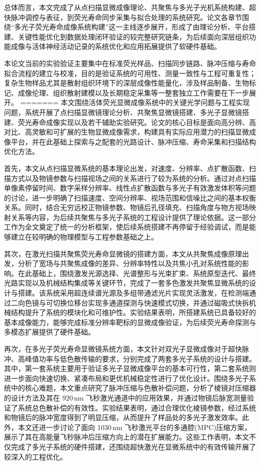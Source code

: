 总体而言，本文完成了从点扫描显微成像理论、共聚焦与多光子光机系统构建、超快脉冲调控与表征，到荧光寿命同步采集与拟合处理的系统研究。论文各章节围绕“多光子荧光寿命成像系统构建”这一主线逐步展开，形成了由理论分析、平台搭建、关键性能优化到数据处理闭环验证的较完整研究链条，为后续面向深层组织功能成像与活体神经活动记录的系统优化和应用拓展提供了软硬件基础。

本论文当前的实验验证主要集中在标准荧光样品、扫描同步链路、脉冲压缩与寿命拟合流程的建立与校准，目的是验证系统的可用性、测量一致性与工程可重复性；复杂生物样品尤其是散射组织环境下的深层成像性能量化，涉及样品制备、生物标记、成像伦理、组织散射建模以及长期稳定采集等一整套独立工作需要在下一步展开。
=======
本文围绕活体荧光显微成像系统中的关键光学问题与工程实现问题，系统开展了点扫描显微镜理论分析、共聚焦显微镜搭建、多光子显微镜搭建、荧光寿命成像实现以及若干辅助实验研究。论文的核心目标是面向高分辨、高对比、高灵敏和可扩展的生物显微成像需求，构建具有实际应用潜力的扫描显微成像平台，并在此基础上探索与之配套的光路设计、脉冲压缩、寿命采集和扫描结构优化方法。

首先，本文从点扫描显微系统的基本理论出发，对速度、分辨率、点扩散函数、扫描方式以及物镜参数与扫描视场之间的关系进行了较为系统的分析。通过对点扫描单像素停留时间、数字采样分辨率、线性点扩散函数与多光子有效激发体积等问题的讨论，进一步明确了扫描速度、空间分辨率、视场范围和信噪比之间的基本权衡关系。同时，结合无穷远校正物镜参数、物镜后孔径填充、扫描角度与物方视场映射关系等内容，为后续共聚焦与多光子系统的工程设计提供了理论依据。这一部分工作为全文奠定了统一的分析框架，使后续系统搭建不再停留于经验调试，而是能够建立在较明确的物理模型与工程参数基础之上。

其次，在激光扫描共聚焦荧光寿命显微镜的搭建方面，本文从共聚焦成像原理出发，分析了宽场与共聚焦成像的差异、分辨率特性以及共焦小孔对系统性能的影响。在此基础上，围绕激发光源选择、光谱整形与光束扩束、系统原型迭代、最终光路实现以及机械结构集成等关键环节，完成了一套多色激发共聚焦显微系统的设计与搭建。该系统采用超连续谱光源及多组带通滤光片实现灵活激发，在检测端通过二向色镜与可切换位移台实现多通道探测与快速模式切换，并通过磁吸式快拆机械结构提升了系统的模块化和可维护性。实验结果表明，所搭建系统已具备较好的基本成像能力，能够完成标准分辨率靶标的显微成像验证，为后续荧光寿命探测与多模态扩展提供了硬件基础。

再次，在多光子荧光寿命显微镜系统方面，本文针对双光子显微成像对于超快脉冲、高峰值功率与低色散传输的要求，分别完成了两套多光子系统的设计与搭建。其中，第一套系统主要用于验证多光子显微成像平台的基本可行性，第二套系统则进一步面向快速切换、紧凑布局和更优机械稳定性进行了优化设计。围绕多光子系统中的核心难题，本文重点研究了脉冲压缩与色散补偿问题，分析了棱镜对压缩器的设计方法及其在 920\,nm 飞秒激光通道中的应用效果，并通过物镜后脉宽测量验证了系统总色散补偿的有效性。实验结果表明，通过合理优化棱镜参数，经过系统和物镜后的脉冲宽度得到了明显压缩，从而提升了样品处的多光子激发效率。此外，本文还进一步讨论了面向 1030\,nm 飞秒激光平台的多通腔(MPC)压缩方案，展示了其在高能量飞秒脉冲后压缩方向上的潜在扩展能力。这些工作表明，本文不仅完成了多光子系统的硬件搭建，还围绕超快激光在显微系统中的有效传输开展了较深入的工程优化。

